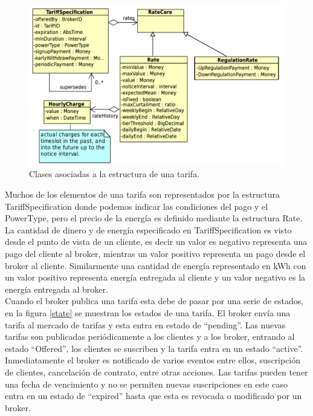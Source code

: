 \begin{figure}[!h]
	\centering
	\includegraphics[width=13cm]{img/tariffstructe.png}
	\caption{Clases asociadas a la estructura de una tarifa.}
	\label{fig:tariff}
\end{figure}

Muchos de los elementos de una tarifa son representados por la estructura TariffSpecification donde podemos indicar las condiciones del pago y el PowerType, pero el precio de la energía es definido mediante la estructura Rate. La cantidad de dinero y de energía especificado en TariffSpecification es visto desde el punto de vista de un cliente, es decir  un valor es negativo representa una pago del cliente al broker, mientras un valor positivo representa un pago desde el broker al cliente. Similarmente una cantidad de energía representado en kWh con un valor positivo representa energía entregada al cliente y un valor negativo es la energía entregada al broker.\\

Cuando el broker publica una tarifa esta debe de pasar por una serie de estados, en la figura \ref{state} se muestran los estados de una tarifa. El broker envía una tarifa al mercado de tarifas y esta entra en estado de “pending”. Las nuevas tarifas son publicadas periódicamente a los clientes y a los broker, entrando al estado “Offered”, los clientes se suscriben y la tarifa entra en un estado “active”. Inmediatamente el broker es notificado de varios eventos entre ellos, suscripción de clientes, cancelación de contrato, entre otras acciones. Las tarifas pueden tener una fecha de vencimiento y no se permiten nuevas suscripciones en este caso entra en un estado de “expired” hasta que esta es revocada o modificado por un broker.

